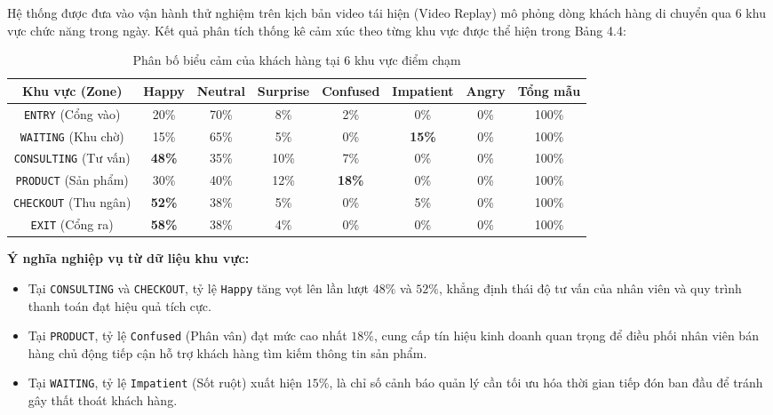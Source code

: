 Hệ thống được đưa vào vận hành thử nghiệm trên kịch bản video tái hiện (Video Replay) mô phỏng dòng khách hàng di chuyển qua 6 khu vực chức năng trong ngày. Kết quả phân tích thống kê cảm xúc theo từng khu vực được thể hiện trong Bảng 4.4:

\begin{table}[H]
\centering
\caption{Phân bố biểu cảm của khách hàng tại 6 khu vực điểm chạm}
\label{tab:zone_emotion_distribution}
\begin{tabularx}{\textwidth}{|C{0.9}|C{0.6}|C{0.6}|C{0.6}|C{0.6}|C{0.6}|C{0.6}|C{0.6}|}
\hline
\textbf{Khu vực (Zone)} & \textbf{Happy} & \textbf{Neutral} & \textbf{Surprise} & \textbf{Confused} & \textbf{Impatient} & \textbf{Angry} & \textbf{Tổng mẫu} \\ \hline
\texttt{ENTRY} (Cổng vào) & 20\% & 70\% & 8\% & 2\% & 0\% & 0\% & 100\% \\ \hline
\texttt{WAITING} (Khu chờ) & 15\% & 65\% & 5\% & 0\% & \textbf{15\%} & 0\% & 100\% \\ \hline
\texttt{CONSULTING} (Tư vấn) & \textbf{48\%} & 35\% & 10\% & 7\% & 0\% & 0\% & 100\% \\ \hline
\texttt{PRODUCT} (Sản phẩm) & 30\% & 40\% & 12\% & \textbf{18\%} & 0\% & 0\% & 100\% \\ \hline
\texttt{CHECKOUT} (Thu ngân) & \textbf{52\%} & 38\% & 5\% & 0\% & 5\% & 0\% & 100\% \\ \hline
\texttt{EXIT} (Cổng ra) & \textbf{58\%} & 38\% & 4\% & 0\% & 0\% & 0\% & 100\% \\ \hline
\end{tabularx}
\end{table}

\noindent \textbf{Ý nghĩa nghiệp vụ từ dữ liệu khu vực:}
\begin{itemize}
    \item Tại \texttt{CONSULTING} và \texttt{CHECKOUT}, tỷ lệ \texttt{Happy} tăng vọt lên lần lượt $48\%$ và $52\%$, khẳng định thái độ tư vấn của nhân viên và quy trình thanh toán đạt hiệu quả tích cực.
    \item Tại \texttt{PRODUCT}, tỷ lệ \texttt{Confused} (Phân vân) đạt mức cao nhất $18\%$, cung cấp tín hiệu kinh doanh quan trọng để điều phối nhân viên bán hàng chủ động tiếp cận hỗ trợ khách hàng tìm kiếm thông tin sản phẩm.
    \item Tại \texttt{WAITING}, tỷ lệ \texttt{Impatient} (Sốt ruột) xuất hiện $15\%$, là chỉ số cảnh báo quản lý cần tối ưu hóa thời gian tiếp đón ban đầu để tránh gây thất thoát khách hàng.
\end{itemize}

